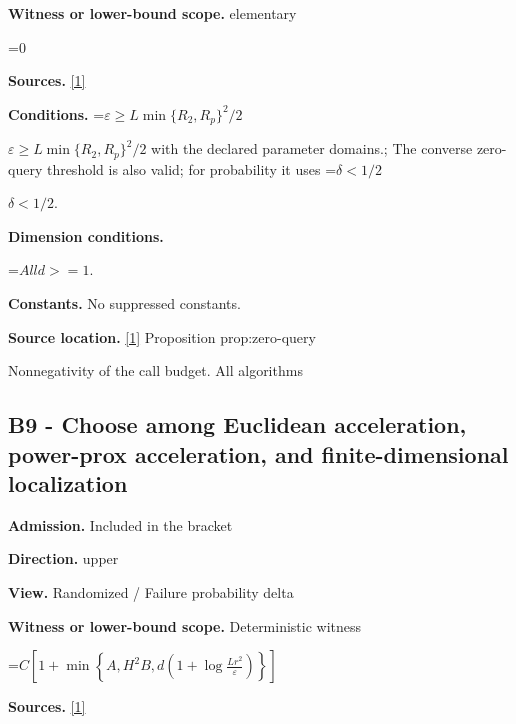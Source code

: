 \documentclass[10pt,a4paper]{article}
\newcommand{\AtlasMath}[1]{\par\begingroup\centering\setbox0=\hbox{$\displaystyle #1$}\ifdim\wd0>1.4\linewidth\typeout{ATLAS WIDE FORMULA: \the\wd0}\fi\ifdim\wd0>\linewidth\resizebox{\linewidth}{!}{\box0}\else\box0\fi\par\endgroup}
\newcommand{\AtlasInlineMath}[1]{\begingroup\setbox0=\hbox{$#1$}\ifdim\wd0>.4\linewidth\endgroup\AtlasMath{#1}\else\endgroup$#1$\fi}
\begin{document}
\textbf{Witness or lower-bound scope.} elementary



\AtlasMath{0}


\textbf{Sources.} \href{https://github.com/WU-Wendao/Colombo/blob/main/colombo_sensorium/Complexity_altas/data/sources/colombo/U02/manuscript.pdf}{[1]}



\textbf{Conditions.} \AtlasInlineMath{\varepsilon\ge L\min\{R_2,R_p\}^2/2} with the declared parameter domains.; The converse zero-query threshold is also valid; for probability it uses \AtlasInlineMath{\delta<1/2}.



\textbf{Dimension conditions.}



\AtlasMath{All d>=1.}


\textbf{Constants.} No suppressed constants.



\textbf{Source location.} \href{https://github.com/WU-Wendao/Colombo/blob/main/colombo_sensorium/Complexity_altas/data/sources/colombo/U02/manuscript.pdf}{[1]} Proposition prop:zero-query



Nonnegativity of the call budget. All algorithms



\subsection{B9 - Choose among Euclidean acceleration, power-prox acceleration, and finite-dimensional localization}


\textbf{Admission.} Included in the bracket



\textbf{Direction.} upper



\textbf{View.} Randomized / Failure probability delta



\textbf{Witness or lower-bound scope.} Deterministic witness



\AtlasMath{C\left[1+\min\left\{A,H^2B,d\left(1+\log\frac{Lr^2}{\varepsilon}\right)\right\}\right]}


\textbf{Sources.} \href{https://github.com/WU-Wendao/Colombo/blob/main/colombo_sensorium/Complexity_altas/data/sources/colombo/U02/manuscript.pdf}{[1]}
\end{document}
